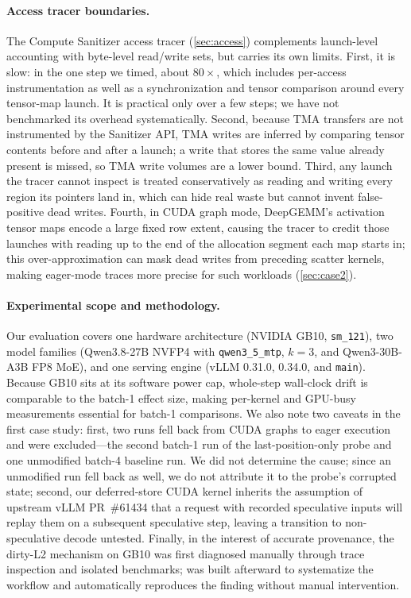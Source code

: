\paragraph{Access tracer boundaries.}
The Compute Sanitizer access tracer (\cref{sec:access}) complements launch-level accounting
with byte-level read/write sets, but carries its own limits.
First, it is slow: in the one step we timed, about $80\times$, which includes per-access
instrumentation as well as a synchronization and tensor comparison around every tensor-map
launch. It is practical only over a few steps; we have not benchmarked its overhead systematically.
Second, because TMA transfers are not instrumented by the Sanitizer API, TMA writes are
inferred by comparing tensor contents before and after a launch; a write that stores the
same value already present is missed, so TMA write volumes are a lower bound.
Third, any launch the tracer cannot inspect is treated conservatively as reading and
writing every region its pointers land in, which can hide real waste but cannot invent
false-positive dead writes.
Fourth, in CUDA graph mode, DeepGEMM's activation tensor maps encode a large fixed row
extent, causing the tracer to credit those launches with reading up to the end of the
allocation segment each map starts in; this over-approximation can mask dead writes from
preceding scatter kernels, making eager-mode traces more precise for such workloads
(\cref{sec:case2}).

\paragraph{Experimental scope and methodology.}
Our evaluation covers one hardware architecture (NVIDIA GB10, \texttt{sm\_121}), two model
families (Qwen3.8-27B NVFP4 with \texttt{qwen3\_5\_mtp}, $k{=}3$, and Qwen3-30B-A3B FP8
MoE), and one serving engine (vLLM 0.31.0, 0.34.0, and \texttt{main}).
Because GB10 sits at its software power cap, whole-step wall-clock drift is comparable to
the batch-1 effect size, making per-kernel and GPU-busy measurements essential for
batch-1 comparisons.
We also note two caveats in the first case study: first, two runs fell back from CUDA
graphs to eager execution and were excluded---the second batch-1 run of the last-position-only probe and one
unmodified batch-4 baseline run. We did not determine the cause; since an unmodified run fell
back as well, we do not attribute it to the probe's corrupted state; second, our deferred-store
CUDA kernel inherits the assumption of upstream vLLM PR~\#61434 that a request with
recorded speculative inputs will replay them on a subsequent speculative step, leaving a
transition to non-speculative decode untested.
Finally, in the interest of accurate provenance, the dirty-L2 mechanism on GB10 was first
diagnosed manually through trace inspection and isolated benchmarks; \sys{} was built
afterward to systematize the workflow and automatically reproduces the finding without
manual intervention.

